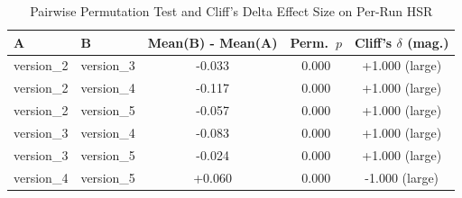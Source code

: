 \begin{table}[H]
\centering
\caption{Pairwise Permutation Test and Cliff's Delta Effect Size on Per-Run HSR}
\label{tab:bootstrap_effect_size}
\begin{tabular}{llccc}
\toprule
A & B & Mean(B) - Mean(A) & Perm.\ $p$ & Cliff's $\delta$ (mag.) \\
\midrule
version\_2 & version\_3 & -0.033 & 0.000 & +1.000 (large) \\
version\_2 & version\_4 & -0.117 & 0.000 & +1.000 (large) \\
version\_2 & version\_5 & -0.057 & 0.000 & +1.000 (large) \\
version\_3 & version\_4 & -0.083 & 0.000 & +1.000 (large) \\
version\_3 & version\_5 & -0.024 & 0.000 & +1.000 (large) \\
version\_4 & version\_5 & +0.060 & 0.000 & -1.000 (large) \\
\bottomrule
\end{tabular}
\end{table}